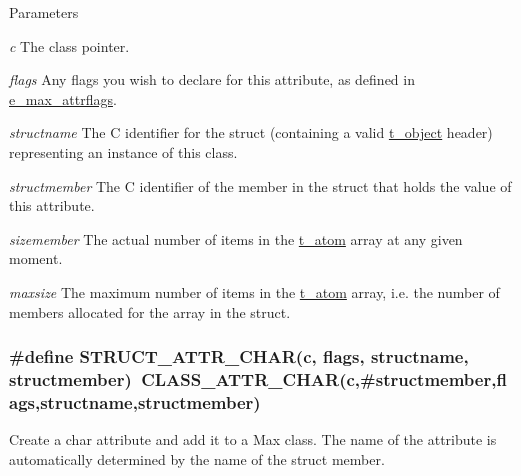 \begin{DoxyParams}{Parameters}
\item[{\em c}]The class pointer. \item[{\em flags}]Any flags you wish to declare for this attribute, as defined in \hyperlink{group__attr_gaf296cfc6741bb19207f6ed8062809115}{e\_\-max\_\-attrflags}. \item[{\em structname}]The C identifier for the struct (containing a valid \hyperlink{structt__object}{t\_\-object} header) representing an instance of this class. \item[{\em structmember}]The C identifier of the member in the struct that holds the value of this attribute. \item[{\em sizemember}]The actual number of items in the \hyperlink{structt__atom}{t\_\-atom} array at any given moment. \item[{\em maxsize}]The maximum number of items in the \hyperlink{structt__atom}{t\_\-atom} array, i.e. the number of members allocated for the array in the struct. \end{DoxyParams}
\hypertarget{group__attr_ga55ed4d32103cfe94049383ba449e536d}{
\subsubsection[{STRUCT\_\-ATTR\_\-CHAR}]{\setlength{\rightskip}{0pt plus 5cm}\#define STRUCT\_\-ATTR\_\-CHAR(c, \/  flags, \/  structname, \/  structmember)~CLASS\_\-ATTR\_\-CHAR(c,\#structmember,flags,structname,structmember)}}
\label{group__attr_ga55ed4d32103cfe94049383ba449e536d}


Create a char attribute and add it to a Max class. The name of the attribute is automatically determined by the name of the struct member.



